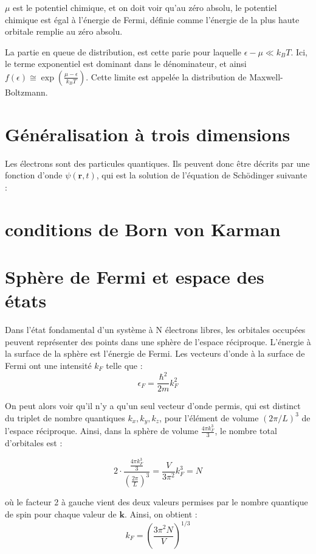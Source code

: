 $\mu$ est le potentiel chimique, et on doit voir qu'au zéro absolu, le potentiel
chimique est égal à l'énergie de Fermi, définie comme l'énergie de la plus haute
orbitale remplie au zéro absolu.

La partie en queue de distribution, est cette parie pour laquelle $\epsilon - \mu
\ll k_BT$. Ici, le terme exponentiel est dominant dans le dénominateur, et ainsi
$f(\epsilon) \cong \exp(\frac{\mu - \epsilon}{k_BT})$. Cette limite est appelée
la distribution de Maxwell-Boltzmann.

\section{Généralisation à trois dimensions}

Les électrons sont des particules quantiques. Ils peuvent donc être décrits par
une fonction d'onde $\psi(\mathbf{r},t)$, qui est la solution de l'équation de
Schödinger suivante :


\section{conditions de Born von Karman}

\section{Sphère de Fermi et espace des états}

Dans l'état fondamental d'un système à N électrons libres, les orbitales occupées
peuvent représenter des points dans une sphère de l'espace réciproque. L'énergie
à la surface de la sphère est l'énergie de Fermi. Les vecteurs d'onde à la
surface de Fermi ont une intensité $k_F$ telle que :
\begin{equation}
    \epsilon_F = \frac{\hbar^2}{2m}k_F^2
    \label{eef}
\end{equation}

On peut alors voir qu'il n'y a qu'un seul vecteur d'onde permis, qui est distinct
du triplet de nombre quantiques $k_x, k_y, k_z$, pour l'élément de volume
$(2\pi/L)^3$ de l'espace réciproque. Ainsi, dans la sphère de volume $\frac{4\pi
k_F^3}{3}$, le nombre total d'orbitales est :

\begin{equation}
    2\cdot \frac{\frac{4\pi k_F^3}{3}}{\left( \frac{2\pi}{L}\right)^3} 
    = \frac{V}{3\pi^2} k_F^3 = N
\end{equation}

où le facteur 2 à gauche vient des deux valeurs permises par le nombre quantique
de spin pour chaque valeur de $\mathbf{k}$. Ainsi, on obtient :
\begin{equation}
    k_F = \left( \frac{3\pi^2N}{V}\right)^{1/3}
    \label{kkf}
\end{equation}


